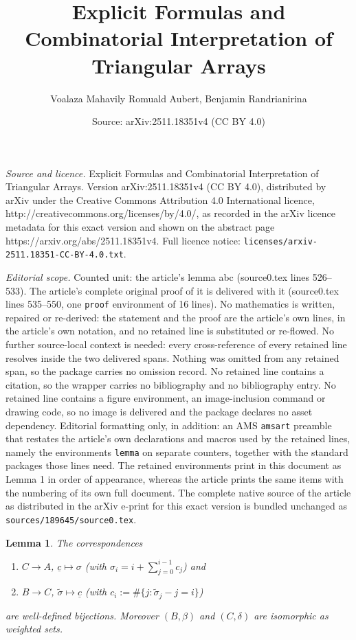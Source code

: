 \documentclass[10pt,a4paper]{amsart}
\title{Explicit Formulas and Combinatorial Interpretation of Triangular Arrays}
\author{Voalaza Mahavily Romuald Aubert, Benjamin Randrianirina}
\date{Source: arXiv:2511.18351v4 (CC BY 4.0)}
\newtheorem{lemma}{Lemma}
\begin{document}
\maketitle

\noindent\emph{Source and licence.} Explicit Formulas and Combinatorial Interpretation of Triangular Arrays. Version arXiv:2511.18351v4 (CC BY 4.0), distributed by arXiv under the Creative Commons Attribution 4.0 International licence, http://creativecommons.org/licenses/by/4.0/, as recorded in the arXiv licence metadata for this exact version and shown on the abstract page https://arxiv.org/abs/2511.18351v4. Full licence notice: \texttt{licenses/arxiv-2511.18351-CC-BY-4.0.txt}.\par\smallskip

\noindent\textit{Editorial scope.} Counted unit: the article's lemma abc (source0.tex lines 526--533). The article's complete original proof of it is delivered with it (source0.tex lines 535--550, one \texttt{proof} environment of 16 lines). No mathematics is written, repaired or re-derived: the statement and the proof are the article's own lines, in the article's own notation, and no retained line is substituted or re-flowed.  No further source-local context is needed: every cross-reference of every retained line resolves inside the two delivered spans.  Nothing was omitted from any retained span, so the package carries no omission record.  No retained line contains a citation, so the wrapper carries no bibliography and no bibliography entry.  No retained line contains a figure environment, an image-inclusion command or drawing code, so no image is delivered and the package declares no asset dependency.  Editorial formatting only, in addition: an AMS \texttt{amsart} preamble that restates the article's own declarations and macros used by the retained lines, namely the environments \texttt{lemma} on separate counters, together with the standard packages those lines need.  The retained environments print in this document as Lemma 1 in order of appearance, whereas the article prints the same items with the numbering of its own full document.  The complete native source of the article as distributed in the arXiv e-print for this exact version is bundled unchanged as \texttt{sources/189645/source0.tex}.
\begin{lemma}\label{abc}
	The correspondences 
	\begin{enumerate}[label=(\alph*)]
		\item \label{aaba} $C\to A$, $\underline{c}\mapsto \sigma$ (with $\sigma_i=i+\sum_{j=0}^{i-1}c_j$) and
		\item \label{bbbcb} $B\to C$,  $\tilde{\sigma}\mapsto \underline{c}$ (with $c_i:=\# \{j: \tilde{\sigma}_j-j=i\}$)
	\end{enumerate}
	are well-defined bijections. Moreover $ (B,\beta) $ and $ (C,\delta)$ are isomorphic as weighted sets.
\end{lemma}
\end{document}
